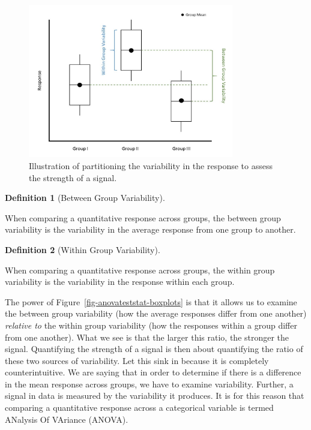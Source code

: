 \documentclass[
  letterpaper,
  DIV=11,
  numbers=noendperiod]{scrreprt}
\theoremstyle{definition}
\newtheorem{definition}{Definition}[chapter]
\theoremstyle{definition}
\theoremstyle{plain}
\theoremstyle{remark}
\begin{document}
\begin{figure}

{\centering \includegraphics[width=0.8\textwidth,height=\textheight]{./images/ANOVATestStat-Partition-Variability.jpg}

}

\caption{\label{fig-anovateststat-partition-variability}Illustration of
partitioning the variability in the response to assess the strength of a
signal.}

\end{figure}

\begin{definition}[Between Group
Variability]\protect\hypertarget{def-between-group-variability}{}\label{def-between-group-variability}

When comparing a quantitative response across groups, the between group
variability is the variability in the average response from one group to
another.

\end{definition}

\begin{definition}[Within Group
Variability]\protect\hypertarget{def-within-group-variability}{}\label{def-within-group-variability}

When comparing a quantitative response across groups, the within group
variability is the variability in the response within each group.

\end{definition}

The power of Figure~\ref{fig-anovateststat-boxplots} is that it allows
us to examine the between group variability (how the average responses
differ from one another) \emph{relative to} the within group variability
(how the responses within a group differ from one another). What we see
is that the larger this ratio, the stronger the signal. Quantifying the
strength of a signal is then about quantifying the ratio of these two
sources of variability. Let this sink in because it is completely
counterintuitive. We are saying that in order to determine if there is a
difference in the mean response across groups, we have to examine
variability. Further, a signal in data is measured by the variability it
produces. It is for this reason that comparing a quantitative response
across a categorical variable is termed ANalysis Of VAriance (ANOVA).
\end{document}
